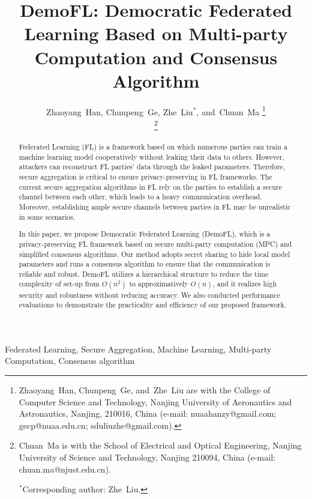 \documentclass[journal]{IEEEtran}
\begin{document}
\title {DemoFL: Democratic Federated Learning Based on Multi-party Computation and Consensus Algorithm}

\author{Zhaoyang~Han, 
        Chunpeng~Ge, 
        Zhe~Liu$^*$, 
        and~Chuan~Ma%
\thanks{Zhaoyang~Han, Chunpeng~Ge, and~Zhe~Liu are with the College of Computer Science and Technology, Nanjing University of Aeronautics and Astronautics, Nanjing, 210016, China (e-mail: nuaahanzy@gmail.com; gecp@nuaa.edu.cn; sduliuzhe@gmail.com).}

\thanks{Chuan~Ma is with the School of Electrical and Optical Engineering, Nanjing University of Science and Technology, Nanjing 210094, China (e-mail: chuan.ma@njust.edu.cn).

$^*$Corresponding author: Zhe~Liu.}
}

\maketitle

\begin{abstract}
Federated Learning (FL) is a framework based on which numerous parties can train a machine learning model cooperatively without leaking their data to others. However, attackers can reconstruct FL parties' data through the leaked parameters. Therefore, secure aggregation is critical to ensure privacy-preserving in FL frameworks. The current secure aggregation algorithms in FL rely on the parties to establish a secure channel between each other, which leads to a heavy communication overhead. Moreover, establishing ample secure channels between parties in FL may be unrealistic in some scenarios.

In this paper, we propose Democratic Federated Learning (DemoFL), which is a privacy-preserving FL framework based on secure multi-party computation (MPC) and simplified consensus algorithms. Our method adopts secret sharing to hide local model parameters and runs a consensus algorithm to ensure that the communication is reliable and robust. DemoFL utilizes a hierarchical structure to reduce the time complexity of set-up from $O(n^2)$ to approximatively $O(n)$, and it realizes high security and robustness without reducing accuracy. We also conducted performance evaluations to demonstrate the practicality and efficiency of our proposed framework. 

\end{abstract}

\begin{IEEEkeywords}
    Federated Learning, Secure Aggregation, Machine Learning, Multi-party Computation, Consensus algorithm
\end{IEEEkeywords}
\end{document}

